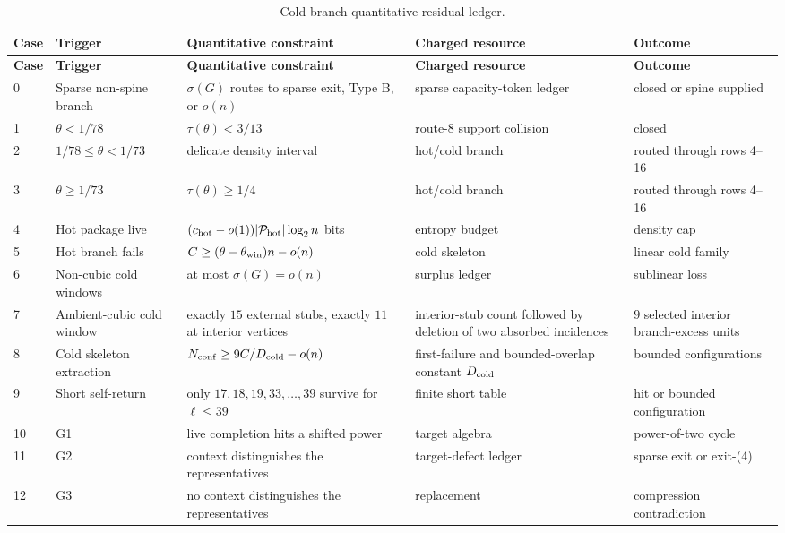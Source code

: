 \documentclass[11pt]{article}
\begin{document}
\begin{longtable}{C{0.05\textwidth} L{0.22\textwidth} L{0.22\textwidth} L{0.20\textwidth} L{0.21\textwidth}}
\caption{Cold branch quantitative residual ledger.}\label{tab:cold-branch-ledger}\\
\toprule
\textbf{Case} & \textbf{Trigger} & \textbf{Quantitative constraint} & \textbf{Charged resource} & \textbf{Outcome} \\
\midrule
\endfirsthead
\toprule
\textbf{Case} & \textbf{Trigger} & \textbf{Quantitative constraint} & \textbf{Charged resource} & \textbf{Outcome} \\
\midrule
{} & Sparse non-spine branch & \(\sigma(G)\) routes to sparse exit, Type B, or \(o(n)\) & sparse capacity-token ledger & closed or spine supplied \\
1 & \(\theta<1/78\) & \(\tau(\theta)<3/13\) & route-8 support collision & closed \\
2 & \(1/78\le\theta<1/73\) & delicate density interval & hot/cold branch & routed through rows 4--16 \\
3 & \(\theta\ge1/73\) & \(\tau(\theta)\ge1/4\) & hot/cold branch & routed through rows 4--16 \\
4 & Hot package live & \((c_{\rm hot}-o(1))|\mathcal P_{\rm hot}|\log_2 n\) bits & entropy budget & density cap \\
5 & Hot branch fails & \(C\ge(\theta-\theta_{\rm win})n-o(n)\) & cold skeleton & linear cold family \\
6 & Non-cubic cold windows & at most \(\sigma(G)=o(n)\) & surplus ledger & sublinear loss \\
7 & Ambient-cubic cold window & exactly \(15\) external stubs, exactly \(11\) at interior vertices & interior-stub count followed by deletion of two absorbed incidences & \(9\) selected interior branch-excess units \\
8 & Cold skeleton extraction & \(N_{\rm conf}\ge9C/D_{\rm cold}-o(n)\) & first-failure and bounded-overlap constant \(D_{\rm cold}\) & bounded configurations \\
9 & Short self-return & only \(17,18,19,33,\ldots,39\) survive for \(\ell\le39\) & finite short table & hit or bounded configuration \\
10 & G1 & live completion hits a shifted power & target algebra & power-of-two cycle \\
11 & G2 & context distinguishes the representatives & target-defect ledger & sparse exit or exit-\textup{(4)} \\
12 & G3 & no context distinguishes the representatives & replacement & compression contradiction \\

\end{longtable}
\end{document}
